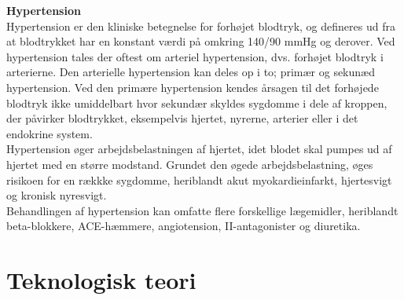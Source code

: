 \newpage

\textbf{Hypertension}\\
Hypertension er den kliniske betegnelse for forhøjet blodtryk, og defineres ud fra at blodtrykket har en konstant værdi på omkring 140/90 mmHg og derover. Ved hypertension tales der oftest om arteriel hypertension, dvs. forhøjet blodtryk i arterierne. Den arterielle hypertension kan deles op i to; primær og sekunæd hypertension. Ved den primære hypertension kendes årsagen til det forhøjede blodtryk ikke umiddelbart hvor sekundær skyldes sygdomme i dele af kroppen, der påvirker blodtrykket, eksempelvis hjertet, nyrerne, arterier eller i det endokrine system.\\
Hypertension øger arbejdsbelastningen af hjertet, idet blodet skal pumpes ud af hjertet med en større modstand. Grundet den øgede arbejdsbelastning, øges risikoen for en rækkke sygdomme, heriblandt akut myokardieinfarkt, hjertesvigt og kronisk nyresvigt. \\
Behandlingen af hypertension kan omfatte flere forskellige lægemidler, heriblandt beta-blokkere, ACE-hæmmere, angiotension, II-antagonister og diuretika.


\section{Teknologisk teori}

